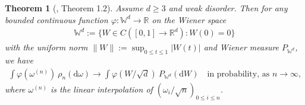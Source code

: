 \documentclass[11pt,reqno]{amsart}
\numberwithin{equation}{section}
\newtheorem{thm}{Theorem}[section]
\theoremstyle{definition}
\begin{document}
\begin{thm}[\cite{comets-yoshida06}, Theorem 1.2]
Assume $d \geq 3$ and weak disorder.
Then for any bounded continuous function ${\varphi} : {\mathbb{W}}^d \to {\mathbb{R}}$ on the Wiener space
{\begin{align*} {
{\mathbb{W}}^d := \{W \in C([0,1] \to {\mathbb{R}}^d) : W(0) = 0\}
} \end{align*}}
with the uniform norm $\|W\| := \sup_{0 \leq t \leq 1} |W(t)|$ and Wiener measure $P_{{\mathbb{W}}^d}$, we have
{\begin{align*} {
\int {\varphi}(\omega^{(n)})\ \rho_n({\mathrm{d}} \omega) \to \int {\varphi}(W/\sqrt{d})\ P_{{\mathbb{W}}^d}({\mathrm{d}} W) \quad \text{in probability, as $n \to \infty$,}
} \end{align*}}
where $\omega^{(n)}$ is the linear interpolation of $(\omega_{i}/\sqrt{n})_{0 \leq i \leq n}$.
\end{thm}
\end{document}
